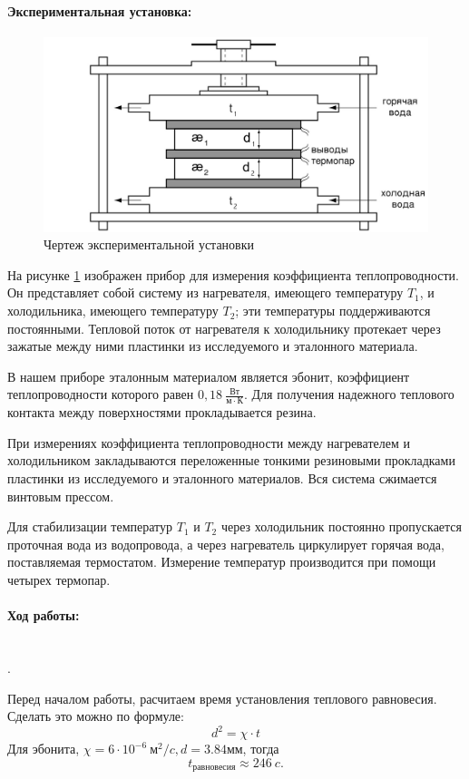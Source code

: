 \documentclass[a4paper, 12pt]{article}
\newcommand{\parag}[1]{\paragraph*{#1:}}
\newcounter{Points}
\newcommand{\point}{\arabic{Points}. \addtocounter{Points}{1}}
\begin{document}
\parag{Экспериментальная установка}

\begin{figure}[H]
	\begin{center}
		\includegraphics[width=15cm]{setup.jpg}
		\caption{Чертеж экспериментальной установки}
        \label{img:setup}
	\end{center}
\end{figure}

На рисунке \ref{img:setup} изображен прибор для измерения коэффициента теплопроводности. Он представляет собой систему из нагревателя, имеющего температуру $ T_1 $, и холодильника, имеющего температуру $ T_2 $; эти температуры поддерживаются постоянными. Тепловой поток от нагревателя к холодильнику протекает через зажатые между ними пластинки из исследуемого и эталонного материала. 

В нашем приборе эталонным материалом является эбонит, коэффициент теплопроводности которого равен $ 0,18~\frac{Вт}{м \cdot К}$. Для получения надежного теплового контакта между поверхностями прокладывается резина. 

При измерениях коэффициента теплопроводности между нагревателем и холодильником закладываются переложенные тонкими резиновыми прокладками пластинки из исследуемого и эталонного материалов. Вся система сжимается винтовым прессом. 

Для стабилизации температур $ T_1 $ и $ T_2 $ через холодильник постоянно пропускается проточная вода из водопровода, а через нагреватель циркулирует горячая вода, поставляемая термостатом. Измерение температур производится при помощи четырех термопар.

\parag {Ход работы} ~\\
\point Перед началом работы, расчитаем время установления теплового равновесия. Сделать это можно по формуле:
$$d^2 = \chi \cdot t$$
Для эбонита, $\chi = 6 \cdot 10^{-6}~м^2/c, d = 3.84 мм$, тогда 
$$t_{равновесия} \approx 246~c.$$
\end{document}
